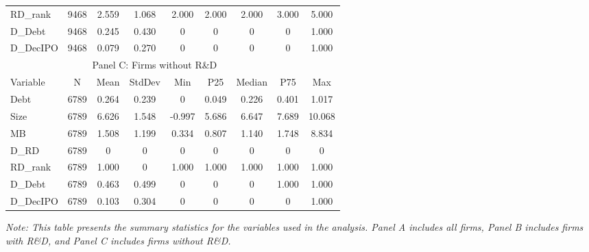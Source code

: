 \documentclass[12pt, times]{article}
\begin{document}
\begin{table}[h!]
\begin{tabular}{lcccccccc}
        RD\_rank & 9468 & 2.559 & 1.068 & 2.000 & 2.000 & 2.000 & 3.000 & 5.000 \\
        D\_Debt & 9468 & 0.245 & 0.430 & 0 & 0 & 0 & 0 & 1.000 \\
        D\_DecIPO & 9468 & 0.079 & 0.270 & 0 & 0 & 0 & 0 & 1.000 \\
        \midrule
        \multicolumn{8}{c}{Panel C: Firms without R\&D} \\
        \midrule
        Variable & N & Mean & StdDev & Min & P25 & Median & P75 & Max \\
        \midrule
        Debt & 6789 & 0.264 & 0.239 & 0 & 0.049 & 0.226 & 0.401 & 1.017 \\
        Size & 6789 & 6.626 & 1.548 & -0.997 & 5.686 & 6.647 & 7.689 & 10.068 \\
        MB & 6789 & 1.508 & 1.199 & 0.334 & 0.807 & 1.140 & 1.748 & 8.834 \\
        D\_RD & 6789 & 0 & 0 & 0 & 0 & 0 & 0 & 0 \\
        RD\_rank & 6789 & 1.000 & 0 & 1.000 & 1.000 & 1.000 & 1.000 & 1.000 \\
        D\_Debt & 6789 & 0.463 & 0.499 & 0 & 0 & 0 & 1.000 & 1.000 \\
        D\_DecIPO & 6789 & 0.103 & 0.304 & 0 & 0 & 0 & 0 & 1.000 \\
        \bottomrule
    \end{tabular}
    \newline
    \textit{Note: This table presents the summary statistics for the variables used in the analysis. Panel A includes all firms, Panel B includes firms with R\&D, and Panel C includes firms without R\&D.}
\end{table}
\end{document}
